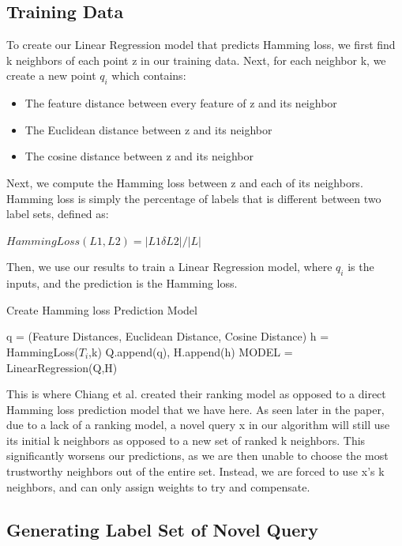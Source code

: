 \documentclass{article}
\begin{document}
\subsection{Training Data}

To create our Linear Regression model that predicts Hamming loss, we first find k neighbors of each point z in our training data. Next, for each neighbor k, we create a new point $q_i$ which contains:
\begin{itemize}
\item The feature distance between every feature of z and its neighbor
\item The Euclidean distance between z and its neighbor
\item The cosine distance between z and its neighbor
\end{itemize}

Next, we compute the Hamming loss between z and each of its neighbors. Hamming loss is simply the percentage of labels that is different between two label sets, defined as:

$HammingLoss(L1,L2) = |L1 \delta L2|/|L|$

Then, we use our results to train a Linear Regression model, where $q_i$ is the inputs, and the prediction is the Hamming loss. 

\begin{algorithm}
   \caption{Create Hamming loss Prediction Model}
   \label{alg:example}
\begin{algorithmic}
   \STATE q = (Feature Distances, Euclidean Distance, Cosine Distance)
   \STATE h = HammingLoss($T_i$,k)
   \STATE Q.append(q), H.append(h)
   \ENDFOR
    \ENDFOR
    \STATE MODEL = LinearRegression(Q,H)
\end{algorithmic}
\end{algorithm}

This is where Chiang et al. created their ranking model as opposed to a direct Hamming loss prediction model that we have here. As seen later in the paper, due to a lack of a ranking model, a novel query x in our algorithm will still use its initial k neighbors as opposed to a new set of ranked k neighbors. This significantly worsens our predictions, as we are then unable to choose the most trustworthy neighbors out of the entire set. Instead, we are forced to use x's k neighbors, and can only assign weights to try and compensate. 

\subsection{Generating Label Set of Novel Query}
\end{document}
